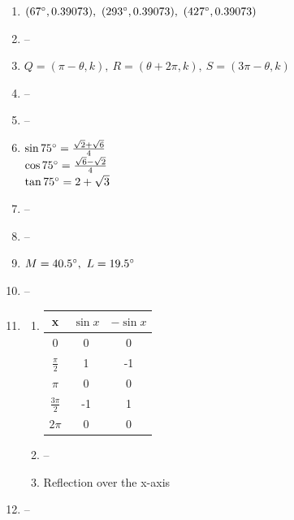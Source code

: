 \documentclass{article}
\begin{document}
\begin{enumerate}
\begin{enumerate}
	\end{enumerate}

\item $(67\degree, 0.39073), \ (293\degree, 0.39073), \ (427\degree, 0.39073)$

\item --

\item $Q = (\pi - \theta, k), \ R = (\theta + 2\pi, k), \ S = (3\pi - \theta, k)$

\item --

\item --

\item $\sin{75\degree} = \frac{ \sqrt{2} + \sqrt{6}}{4}$ \\
	$\cos{75\degree} = \frac{ \sqrt{6} - \sqrt{2}}{4}$ \\
	$\tan{75\degree} = 2 + \sqrt{3}$

\item --

\item --

\item $M = 40.5\degree, \ L = 19.5\degree$

\item --

\item 

	\begin{enumerate}
	
	\item 
	
	\begin{tabular}{ c | c | c }
	
	x & $\sin{x}$ & $-\sin{x}$ \\
	\hline
	0 & 0 & 0 \\
	$\frac{\pi}{2}$ & 1 & -1 \\
	$\pi$ & 0 & 0 \\
	$\frac{3\pi}{2}$ & -1 & 1 \\
	$2\pi$ & 0 & 0
	
	\end{tabular}
	
	\item --
	
	\item Reflection over the x-axis
	
	\end{enumerate}
	
\item --


\end{enumerate}
\end{document}
